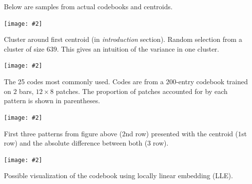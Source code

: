 \documentclass[portrait,a0b,final]{a0poster}
\newenvironment{poster}{
  \begin{center}
  \begin{minipage}[c]{0.98\textwidth}
}{
  \end{minipage} 
  \end{center}
}
\newcommand{\myfig}[3][0]{
\begin{center}
  \vspace{1.5cm}
  \texttt{[image: \#2]}
  \nobreak\medskip
\end{center}}
\begin{document}
\begin{poster}
\begin{multicols}{3}
Below are samples from actual codebooks and centroids.

\myfig[0]{close_patterns1.ps}{.8}
\begin{center}
\begin{minipage}[c]{.7\columnwidth}
\begin{small}
Cluster around first centroid (in \textit{introduction} section).
Random selection from a cluster of size $639$. 
This gives an intuition of the
variance in one cluster.
\end{small}
\end{minipage}
\end{center}

\myfig[0]{codes1.ps}{.8}
\begin{center}
\begin{minipage}[c]{.7\columnwidth}
\begin{small}
The 25 codes most commonly used. 
Codes are from a $200$-entry codebook trained
on $2$ bars, $12 × 8$ patches. The proportion of patches accounted
for by each pattern is shown in parentheses.
\end{small}
\end{minipage}
\end{center}

\myfig[0]{close_patterns_diff.ps}{.8}
\begin{center}
\begin{minipage}[c]{.7\columnwidth}
\begin{small}
First three patterns from figure above ($2$nd row) presented
with the centroid ($1$st row) and the absolute difference between 
both ($3$ row).
\end{small}
\end{minipage}
\end{center}

\newpage

\mbox{} %
\vspace{-1cm}
\myfig[0]{codes_lle.ps}{.8}

\begin{center}
\begin{minipage}[c]{.7\columnwidth}
\begin{small}
Possible visualization of the codebook using locally linear
embedding (LLE).
\end{small}
\end{minipage}
\end{center}


\end{multicols}
\end{poster}
\end{document}
